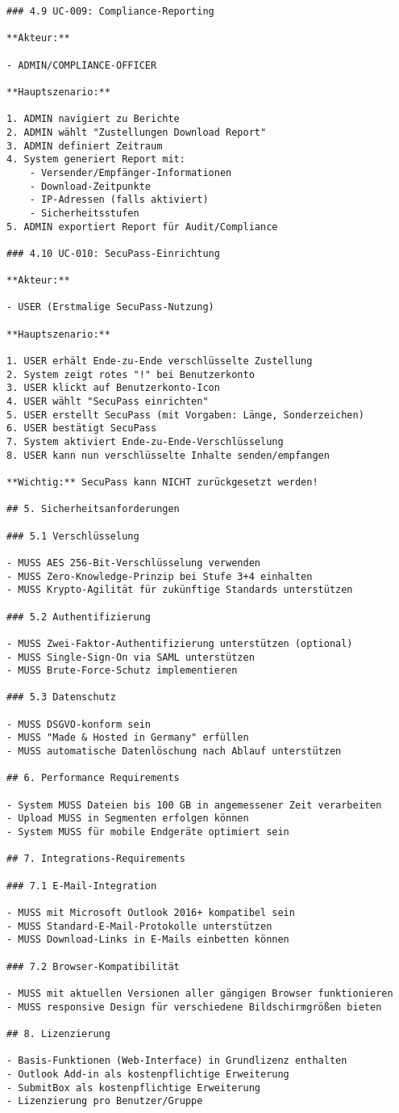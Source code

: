 \begin{verbatim}
### 4.9 UC-009: Compliance-Reporting

**Akteur:**

- ADMIN/COMPLIANCE-OFFICER

**Hauptszenario:**

1. ADMIN navigiert zu Berichte
2. ADMIN wählt "Zustellungen Download Report"
3. ADMIN definiert Zeitraum
4. System generiert Report mit:
    - Versender/Empfänger-Informationen
    - Download-Zeitpunkte
    - IP-Adressen (falls aktiviert)
    - Sicherheitsstufen
5. ADMIN exportiert Report für Audit/Compliance

### 4.10 UC-010: SecuPass-Einrichtung

**Akteur:**

- USER (Erstmalige SecuPass-Nutzung)

**Hauptszenario:**

1. USER erhält Ende-zu-Ende verschlüsselte Zustellung
2. System zeigt rotes "!" bei Benutzerkonto
3. USER klickt auf Benutzerkonto-Icon
4. USER wählt "SecuPass einrichten"
5. USER erstellt SecuPass (mit Vorgaben: Länge, Sonderzeichen)
6. USER bestätigt SecuPass
7. System aktiviert Ende-zu-Ende-Verschlüsselung
8. USER kann nun verschlüsselte Inhalte senden/empfangen

**Wichtig:** SecuPass kann NICHT zurückgesetzt werden!

## 5. Sicherheitsanforderungen

### 5.1 Verschlüsselung

- MUSS AES 256-Bit-Verschlüsselung verwenden
- MUSS Zero-Knowledge-Prinzip bei Stufe 3+4 einhalten
- MUSS Krypto-Agilität für zukünftige Standards unterstützen

### 5.2 Authentifizierung

- MUSS Zwei-Faktor-Authentifizierung unterstützen (optional)
- MUSS Single-Sign-On via SAML unterstützen
- MUSS Brute-Force-Schutz implementieren

### 5.3 Datenschutz

- MUSS DSGVO-konform sein
- MUSS "Made & Hosted in Germany" erfüllen
- MUSS automatische Datenlöschung nach Ablauf unterstützen

## 6. Performance Requirements

- System MUSS Dateien bis 100 GB in angemessener Zeit verarbeiten
- Upload MUSS in Segmenten erfolgen können
- System MUSS für mobile Endgeräte optimiert sein

## 7. Integrations-Requirements

### 7.1 E-Mail-Integration

- MUSS mit Microsoft Outlook 2016+ kompatibel sein
- MUSS Standard-E-Mail-Protokolle unterstützen
- MUSS Download-Links in E-Mails einbetten können

### 7.2 Browser-Kompatibilität

- MUSS mit aktuellen Versionen aller gängigen Browser funktionieren
- MUSS responsive Design für verschiedene Bildschirmgrößen bieten

## 8. Lizenzierung

- Basis-Funktionen (Web-Interface) in Grundlizenz enthalten
- Outlook Add-in als kostenpflichtige Erweiterung
- SubmitBox als kostenpflichtige Erweiterung
- Lizenzierung pro Benutzer/Gruppe
\end{verbatim}
